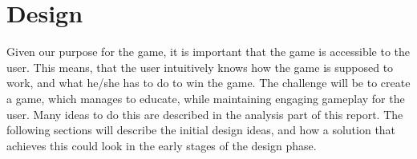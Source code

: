 \chapter{Design}
\label{cha:design}

Given our purpose for the game, it is important that the game is accessible to the user.
This means, that the user intuitively knows how the game is supposed to work, and what he/she has to do to win the game.
The challenge will be to create a game, which manages to educate, while maintaining engaging gameplay for the user.
Many ideas to do this are described in the analysis part of this report.
The following sections will describe the initial design ideas, and how a solution that achieves this could look in the early stages of the design phase.






